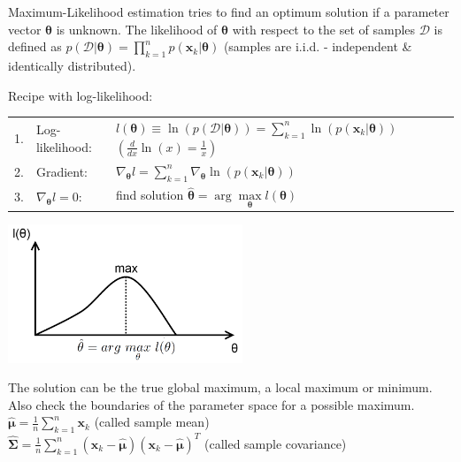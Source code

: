 
  Maximum-Likelihood estimation tries to find an optimum solution if a parameter vector
  $\boldsymbol{\theta}$ is unknown.
  The likelihood of $\boldsymbol{\theta}$ with respect to the set of samples $\mathcal{D}$ is defined as 
  $p(\mathcal{D} | \boldsymbol{\theta}) = \prod_{k=1}^{n} p(\mathbf{x}_k | \boldsymbol{\theta})$ 
  (samples are i.i.d. - independent \& identically distributed).
  
  \begin{minipage}{12cm}
	  Recipe with log-likelihood: \\
	  \begin{tabular}{lll}
	  1. & Log-likelihood: & $l(\boldsymbol{\theta}) \equiv \ln (p(\mathcal{D} | \boldsymbol{\theta}))=\sum\limits_{k=1}^n \ln(p(\mathbf{x}_k | \boldsymbol{\theta}))$ \quad $\left( \frac{d}{dx} \ln(x) = \frac1x \right)$ \\
	  2. & Gradient: &  $\nabla_{\boldsymbol{\theta}} l = 
	  	      \sum\limits_{k=1}^n \nabla_{\boldsymbol{\theta}}\ln(p(\mathbf{x}_k | \boldsymbol{\theta}))$ \\
	  3. & $\nabla_{\boldsymbol{\theta}} l = 0$: & find solution 
	  	      $\boldsymbol{\hat{\theta}}=\arg\max\limits_{\boldsymbol{\theta}} l(\bm{\theta})$ \\
	  \end{tabular}
  \end{minipage}
  \begin{minipage}{8cm}
  	\includegraphics[width=7cm]{./images/MaxLikely.png}
  \end{minipage}
  
  The solution can be the true global maximum, a local maximum or minimum. Also check the boundaries of the parameter space for a possible maximum.
  $\boldsymbol{\hat{\mu}} = \frac1n \sum\limits_{k=1}^n \mathbf{x}_k$ (called sample mean)\\
  $\boldsymbol{\hat{\Sigma}} = \frac1n \sum\limits_{k=1}^n 
  (\boldsymbol{x}_k - \boldsymbol{\hat{\mu}})(\boldsymbol{x}_k - \boldsymbol{\hat{\mu}})^T$ (called sample covariance)
  
